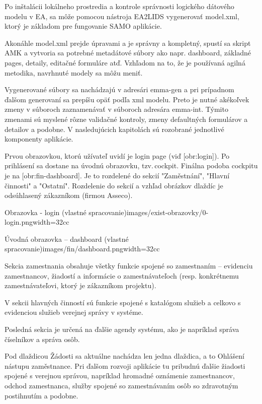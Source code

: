 Po inštalácii lokálneho prostredia a kontrole správnosti logického dátového modelu v EA, sa môže pomocou nástroja EA2LIDS vygenerovať model.xml, ktorý je základom pre fungovanie SAMO aplikácie. 

Akonáhle model.xml prejde úpravami a je správny a kompletný, spustí sa skript AMK a vytvoria sa potrebné metadátové súbory ako napr. dashboard, základné pages, detaily, editačné formuláre atď. Vzhľadom na to, že je používaná agilná metodika, navrhnuté modely sa môžu meniť.

Vygenerované súbory sa nachádzajú v adresári emma-gen a pri prípadnom ďalšom generovaní sa prepíšu opäť podľa xml modelu. Preto je nutné akékoľvek zmeny v súboroch zaznamenávať v súboroch adresára emma-int. Týmito zmenami sú myslené rôzne validačné kontroly, zmeny defaultných formulárov a detailov a podobne. V nasledujúcich kapitolách sú rozobrané jednotlivé komponenty aplikácie.

Prvou obrazovkou, ktorú užívateľ uvidí je login page (viď [obr:login]). Po prihlásení sa dostane na úvodnú obrazovku, tzv.\,cockpit. Finálna podoba cockpitu je na [obr:fin-dashboard]. Je to rozdelené do sekcií "Zaměstnání", "Hlavní činnosti" a "Ostatní". Rozdelenie do sekcií a vzhľad obrázkov dlaždíc je odsúhlasený zákazníkom (firmou Asseco).

{Obrazovka - login (vlastné spracovanie)}{images/exist-obrazovky/0-login.png}{width=32cc} 

{Úvodná obrazovka -- dashboard (vlastné spracovanie)}{images/fin/dashboard.png}{width=32cc}

Sekcia zamestnania obsahuje všetky funkcie spojené so zamestnaním -- evidenciu zamestnancov, žiadostí a informácie o zamestnávateľoch (resp. konkrétnemu zamestnávateľovi, ktorý je zákazníkom projektu). 

V sekcii hlavných činností sú funkcie spojené s katalógom služieb a celkovo s evidenciou služieb verejnej správy v systéme. 

Posledná sekcia je určená na ďalšie agendy systému, ako je napríklad správa číselníkov a správa osôb.


Pod dlaždicou Žádosti sa aktuálne nachádza len jedna dlaždica, a to Ohlášení nástupu zaměstnance. Pri ďalšom rozvoji aplikácie tu pribudnú ďalšie žiadosti spojené s verejnou správou, napríklad hromadné oznámenie zamestnancov, odchod zamestnanca, služby spojené so zamestnávaním osôb so zdravotným postihnutím a podobne.

